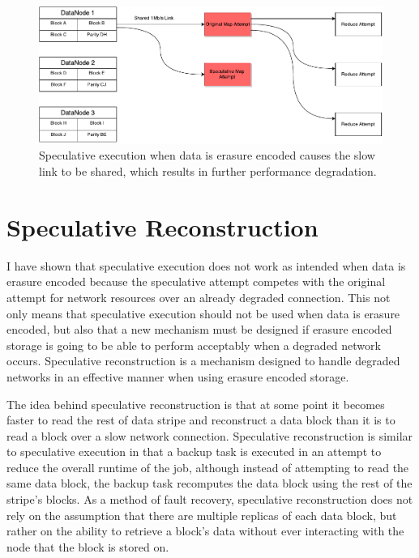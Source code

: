 \documentclass{ucetd}
\begin{document}
\begin{figure}
    \centering
    \includegraphics[width=\textwidth]{diagrams/SpeculativeExecutionErasureCodes.pdf}
    \caption[Speculative Execution and Erasure Codes]{Speculative execution when
    data is erasure encoded causes the slow link to be shared, which results in
    further performance degradation.}
    \label{specExecEras}
\end{figure}


\chapter{Speculative Reconstruction}

I have shown that speculative execution does not work as intended when data
is erasure encoded because the speculative attempt competes with the original
attempt for network resources over an already degraded connection. This not only
means that speculative execution should not be used when data is erasure
encoded, but also that a new mechanism must be designed if erasure encoded
storage is going to be able to perform acceptably when a degraded network
occurs. Speculative reconstruction is a mechanism designed to handle degraded
networks in an effective manner when using erasure encoded storage.

The idea behind speculative reconstruction is that at some point it becomes
faster to read the rest of data stripe and reconstruct a data block than it is
to read a block over a slow network connection.  Speculative reconstruction is
similar to speculative execution in that a backup task is executed in an attempt
to reduce the overall runtime of the job, although instead of attempting to read
the same data block, the backup task recomputes the data block using the rest of
the stripe's blocks.  As a method of fault recovery, speculative reconstruction
does not rely on the assumption that there are multiple replicas of each data
block, but rather on the ability to retrieve a block's data without ever
interacting with the node that the block is stored on.
\end{document}
